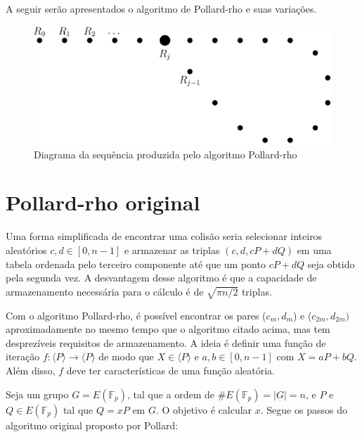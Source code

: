 A seguir serão apresentados o algoritmo de Pollard-rho e suas variações.

\begin{figure}[h]
\centering
\includegraphics[scale=0.4, bb=0 0 888 376]{figuras/rho.eps}
\caption{Diagrama da sequência produzida pelo algoritmo Pollard-rho}
\label{fig:rho}
\end{figure}

\section{Pollard-rho original} \label{Pollard_original}

Uma forma simplificada de encontrar uma colisão seria selecionar inteiros aleatórios $c, d \in [0, n-1]$ e armazenar as triplas $(c, d, cP + dQ)$ em uma tabela ordenada pelo terceiro componente até que um ponto $cP + dQ$ seja obtido pela segunda vez. A desvantagem desse algoritmo é que a capacidade de armazenamento necessária para o cálculo é de $\sqrt{\pi n/2}$ triplas.

Com o algoritmo Pollard-rho, é possível encontrar os pares ($c_m, d_m$) e ($c_{2m}, d_{2m})$ aproximadamente no mesmo tempo que o algoritmo citado acima, mas tem desprezíveis requisitos de armazenamento. A ideia é definir uma função de iteração $f : \langle P \rangle \to \langle P \rangle$ de modo que $X \in \langle P \rangle$ e $a, b \in [0, n-1]$ com $X = aP + bQ$. Além disso, \(f\) deve ter características de uma função aleatória. \cite{Guide}

Seja um grupo $G = E(\mathbb{F}_p)$, tal que a ordem de $\#E(\mathbb{F}_p) = |G| = n$, e \(P\) e \(Q \in E(\mathbb{F}_p)\) tal que $Q = xP$ em \(G\). O objetivo é calcular \(x\). Segue os passos do algoritmo original proposto por Pollard:

